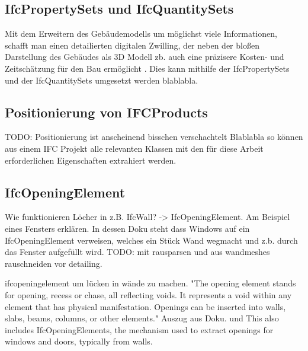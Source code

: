 \subsection{IfcPropertySets und IfcQuantitySets}
Mit dem Erweitern des Gebäudemodells um möglichst viele Informationen, schafft man einen detailierten digitalen Zwilling, der neben der bloßen Darstellung des Gebäudes als 3D Modell zb. auch eine präzisere Kosten- und Zeitschätzung für den Bau ermöglicht \cite{Industry93:online}. 
Dies kann mithilfe der IfcPropertySets und der IfcQuantitySets umgesetzt werden blablabla. %

\subsection{Positionierung von IFCProducts}
TODO: Positionierung ist anscheinend bisschen verschachtelt
Blablabla so können aus einem IFC Projekt alle relevanten Klassen mit den für diese Arbeit erforderlichen Eigenschaften extrahiert werden.


\subsection{IfcOpeningElement}
\label{basic:IfcOpeningElement}
Wie funktionieren Löcher in z.B. IfcWall? -> IfcOpeningElement.
Am Beispiel eines Fensters erklären. In dessen Doku steht dass Windows auf ein IfcOpeningElement verweisen, welches ein Stück Wand wegmacht und z.b. durch das Fenster aufgefüllt wird.
TODO: mit rausparsen und aus wandmeshes rauschneiden vor detailing.

ifcopeningelement um lücken in wände zu machen.
"The opening element stands for opening, recess or chase, all reflecting voids. It represents a void within any element that has physical manifestation. Openings can be inserted into walls, slabs, beams, columns, or other elements." Auszug aus Doku. und This also includes IfcOpeningElements, the mechanism used to extract openings for windows and doors, typically from walls. %

